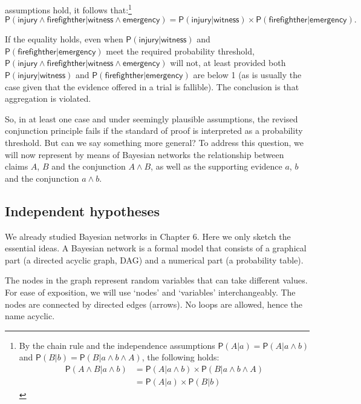 \documentclass[
  10pt,
  dvipsnames,enabledeprecatedfontcommands]{scrartcl}
\newcommand{\pr}[1]{\ensuremath{\mathsf{P}(#1)}}
\begin{document}
assumptions hold, it follows that:\footnote{By the chain rule and the
  independence assumptions \(\pr{A | a}=\pr{A | a \wedge b}\) and
  \(\pr{B | b}=\pr{B | a \wedge b \wedge A}\), the following holds:
  \begin{align*}
  \pr{A \wedge  B \vert a \wedge b}& =\pr{A \vert a \wedge b} \times \pr{B \vert  a \wedge b \wedge A}\\
   & = \pr{A \vert a} \times \pr{B \vert  b}
   \end{align*}}
\[\pr{\textsf{injury} \wedge \textsf{firefighther} \vert \textsf{witness} \wedge \textsf{emergency}}= \pr{\textsf{injury} \vert \textsf{witness}} \times \pr{\textsf{firefighther} \vert \textsf{emergency}}. \]

\noindent If the equality holds, even when
\(\pr{\textsf{injury} \vert \textsf{witness}}\) and
\(\pr{\textsf{firefighther} \vert \textsf{emergency} }\) meet the
required probability threshold,
\(\pr{\textsf{injury} \wedge \textsf{firefighther} \vert \textsf{witness} \wedge \textsf{emergency}}\)
will not, at least provided both
\(\pr{\textsf{injury} \vert \textsf{witness}}\) and
\(\pr{\textsf{firefighther} \vert \textsf{emergency} }\) are below 1 (as
is usually the case given that the evidence offered in a trial is
fallible). The conclusion is that aggregation is violated.

So, in at least one case and under seemingly plausible assumptions, the
revised conjunction principle fails if the standard of proof is
interpreted as a probability threshold. But can we say something more
general? To address this question, we will now represent by means of
Bayesian networks the relationship between claims \(A\), \(B\) and the
conjunction \(A\wedge B\), as well as the supporting evidence \(a\),
\(b\) and the conjunction \(a\wedge b\).

\hypertarget{independent-hypotheses}{%
\subsection{Independent hypotheses}\label{independent-hypotheses}}

We already studied Bayesian networks in Chapter 6.
 Here we only sketch the essential ideas. A
Bayesian network is a formal model that consists of a graphical part (a
directed acyclic graph, \textsf{DAG}) and a numerical part (a
probability table).

The nodes in the graph represent random variables that can take
different values. For ease of exposition, we will use `nodes' and
`variables' interchangeably. The nodes are connected by directed edges
(arrows). No loops are allowed, hence the name acyclic.
\end{document}
